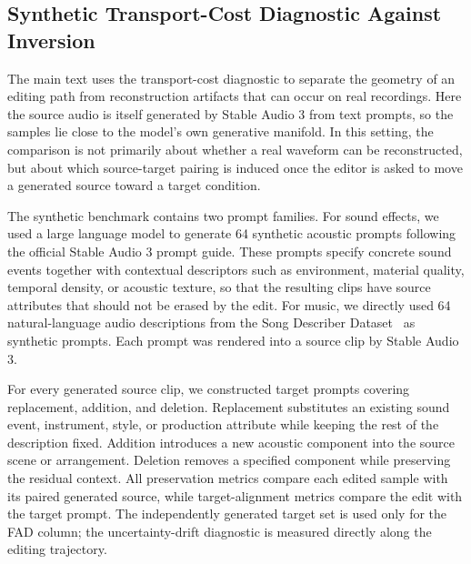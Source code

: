 \subsection{Synthetic Transport-Cost Diagnostic Against Inversion}
\label{app:transport_diagnostic}

The main text uses the transport-cost diagnostic to separate the geometry of an editing path from reconstruction artifacts that can occur on real recordings.
Here the source audio is itself generated by Stable Audio 3 from text prompts, so the samples lie close to the model's own generative manifold.
In this setting, the comparison is not primarily about whether a real waveform can be reconstructed, but about which source-target pairing is induced once the editor is asked to move a generated source toward a target condition.

The synthetic benchmark contains two prompt families.
For sound effects, we used a large language model to generate 64 synthetic acoustic prompts following the official Stable Audio 3 prompt guide.
These prompts specify concrete sound events together with contextual descriptors such as environment, material quality, temporal density, or acoustic texture, so that the resulting clips have source attributes that should not be erased by the edit.
For music, we directly used 64 natural-language audio descriptions from the Song Describer Dataset~\cite{manco2023songdescriberdatasetcorpus} as synthetic prompts.
Each prompt was rendered into a source clip by Stable Audio 3.

For every generated source clip, we constructed target prompts covering replacement, addition, and deletion.
Replacement substitutes an existing sound event, instrument, style, or production attribute while keeping the rest of the description fixed.
Addition introduces a new acoustic component into the source scene or arrangement.
Deletion removes a specified component while preserving the residual context.
All preservation metrics compare each edited sample with its paired generated source, while target-alignment metrics compare the edit with the target prompt.
The independently generated target set is used only for the FAD column; the uncertainty-drift diagnostic is measured directly along the editing trajectory.

